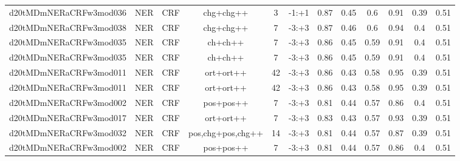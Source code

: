 \documentclass[a4paper]{article}
\begin{document}
\begin{landscape}
\begin{center}
\begin{tabular}{ |c|c|c|c|c|c|c|c|c|c|c|c|}
 
 	
 	\small{ d20tMDmNERaCRFw3mod036 } & \small{ NER} & \small{  CRF }  & chg+chg++  &  3 &  \small{  -1:+1 }  &  0.87 & 0.45 & 0.6  &  0.91 & 0.39 & 0.51 \\
 	

 
 	
 	\small{ d20tMDmNERaCRFw3mod038 } & \small{ NER} & \small{  CRF }  & chg+chg++  &  7 &  \small{  -3:+3 }  &  0.87 & 0.46 & 0.6  &  0.94 & 0.4 & 0.51 \\
 	

 
 	
 	\small{ d20tMDmNERaCRFw3mod035 } & \small{ NER} & \small{  CRF }  & ch+ch++  &  7 &  \small{  -3:+3 }  &  0.86 & 0.45 & 0.59  &  0.91 & 0.4 & 0.51 \\
 	

 
 	
 	\small{ d20tMDmNERaCRFw3mod035 } & \small{ NER} & \small{  CRF }  & ch+ch++  &  7 &  \small{  -3:+3 }  &  0.86 & 0.45 & 0.59  &  0.91 & 0.4 & 0.51 \\
 	

 
 	
 	\small{ d20tMDmNERaCRFw3mod011 } & \small{ NER} & \small{  CRF }  & ort+ort++  &  42 &  \small{  -3:+3 }  &  0.86 & 0.43 & 0.58  &  0.95 & 0.39 & 0.51 \\
 	

 
 	
 	\small{ d20tMDmNERaCRFw3mod011 } & \small{ NER} & \small{  CRF }  & ort+ort++  &  42 &  \small{  -3:+3 }  &  0.86 & 0.43 & 0.58  &  0.95 & 0.39 & 0.51 \\
 	

 
 	
 	\small{ d20tMDmNERaCRFw3mod002 } & \small{ NER} & \small{  CRF }  & pos+pos++  &  7 &  \small{  -3:+3 }  &  0.81 & 0.44 & 0.57  &  0.86 & 0.4 & 0.51 \\
 	

 
 	
 	\small{ d20tMDmNERaCRFw3mod017 } & \small{ NER} & \small{  CRF }  & ort+ort++  &  7 &  \small{  -3:+3 }  &  0.83 & 0.43 & 0.57  &  0.93 & 0.39 & 0.51 \\
 	

 
 	
 	\small{ d20tMDmNERaCRFw3mod032 } & \small{ NER} & \small{  CRF }  & pos,chg+pos,chg++  &  14 &  \small{  -3:+3 }  &  0.81 & 0.44 & 0.57  &  0.87 & 0.39 & 0.51 \\
 	

 
 	
 	\small{ d20tMDmNERaCRFw3mod002 } & \small{ NER} & \small{  CRF }  & pos+pos++  &  7 &  \small{  -3:+3 }  &  0.81 & 0.44 & 0.57  &  0.86 & 0.4 & 0.51 \\
 	


\end{tabular}
\end{center}
\end{landscape}
\end{document}
